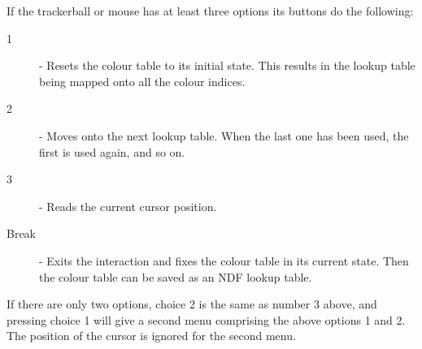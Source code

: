 {{{      If the trackerball or mouse has at least three options its buttons
      do the following:
      \begin{description}
      \item [1] - Resets the colour table to its initial state. This results
                  in the lookup table being mapped onto all the colour indices.
      \item [2] - Moves onto the next lookup table. When the last one has been
                  used, the first is used again, and so on.
      \item [3] - Reads the current cursor position.
      \item [Break] - Exits the interaction and fixes the colour table in
                  its current state.  Then the colour table can be saved
                  as an NDF lookup table.
      \end{description}

       If there are only two options, choice 2 is the same as number 3
       above, and pressing choice 1 will give a second menu comprising
       the above options 1 and 2. The position of the cursor is ignored
       for the second menu.

}}}
